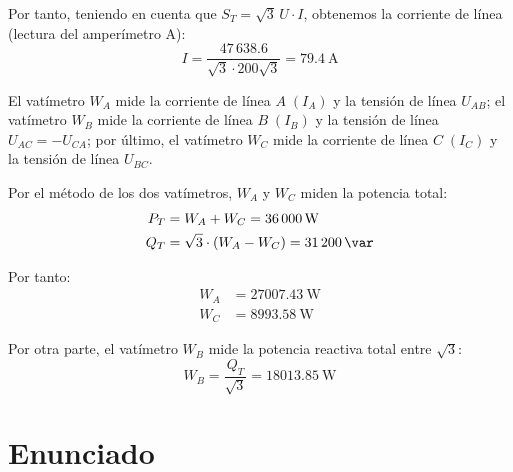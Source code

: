 Por tanto, teniendo en cuenta que $S_T = \sqrt{3} \, U \cdot I$, obtenemos la corriente de línea (lectura del amperímetro A):
\begin{equation*}
  I = \frac{47\,638.6}{\sqrt{3} \cdot 200\sqrt{3}} = \qty{79.4}{\ampere}
\end{equation*}


El vatímetro $W_A$ mide la corriente de línea $A\;(I_A)$ y la tensión de línea $U_{AB}$; el vatímetro $W_B$ mide la corriente de línea $B\;(I_B)$ y la tensión de línea $U_{AC}=-U_{CA}$; por último, el vatímetro $W_C$ mide la corriente de línea $C\;(I_C)$ y la tensión de línea $U_{BC}$.

\vspace{3mm}
Por el método de los dos vatímetros, $W_A$ y $W_C$ miden la potencia total: 
\begin{align*}
  P_T &= W_A + W_C =\qty{36000}{\watt}\\
  Q_T &= \sqrt{3}\cdot (W_A - W_C) = \qty{31200}{\var}
\end{align*}

Por tanto:
\begin{align*}
  W_A &= \qty{27007.43}{\watt}\\
  W_C &= \qty{8993.58}{\watt}
\end{align*}

Por otra parte, el vatímetro $W_B$ mide la potencia reactiva total entre $\sqrt{3}$:
\begin{equation*}
  W_B = \frac{Q_T}{\sqrt{3}}=\qty{18013.85}{\watt}
\end{equation*}



\section{Enunciado}
 
